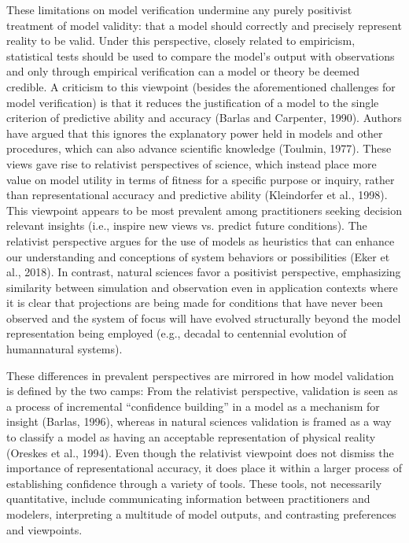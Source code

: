 \documentclass[letterpaper,10pt,english]{sphinxmanual}
\begin{document}
\sphinxAtStartPar
These limitations on model verification undermine any purely positivist treatment of model validity: that a model should correctly and precisely represent reality to be valid. Under this perspective, closely related to empiricism, statistical tests should be used to compare the model’s output with observations and only through empirical verification can a model or theory be deemed credible. A criticism to this viewpoint (besides the aforementioned challenges for model verification) is that it reduces the justification of a model to the single criterion of predictive ability and accuracy (Barlas and Carpenter, 1990). Authors have argued that this ignores the explanatory power held in models and other procedures, which can also advance scientific knowledge (Toulmin, 1977). These views gave rise to relativist perspectives of science, which instead place more value on model utility in terms of fitness for a specific purpose or inquiry, rather than representational accuracy and predictive ability (Kleindorfer et al., 1998). This viewpoint appears to be most prevalent among practitioners seeking decision relevant insights (i.e., inspire new views vs. predict future conditions). The relativist perspective argues for the use of models as heuristics that can enhance our understanding and conceptions of system behaviors or possibilities (Eker et al., 2018). In contrast, natural sciences favor a positivist perspective, emphasizing similarity between simulation and observation even in application contexts where it is clear that projections are being made for conditions that have never been observed and the system of focus will have evolved structurally beyond the model representation being employed (e.g., decadal to centennial evolution of human\sphinxhyphen{}natural systems).

\sphinxAtStartPar
These differences in prevalent perspectives are mirrored in how model validation is defined by the two camps: From the relativist perspective, validation is seen as a process of incremental “confidence building” in a model as a mechanism for insight (Barlas, 1996), whereas in natural sciences validation is framed as a way to classify a model as having an acceptable representation of physical reality (Oreskes et al., 1994). Even though the relativist viewpoint does not dismiss the importance of representational accuracy, it does place it within a larger process of establishing confidence through a variety of tools. These tools, not necessarily quantitative, include communicating information between practitioners and modelers, interpreting a multitude of model outputs, and contrasting preferences and viewpoints.
\end{document}
